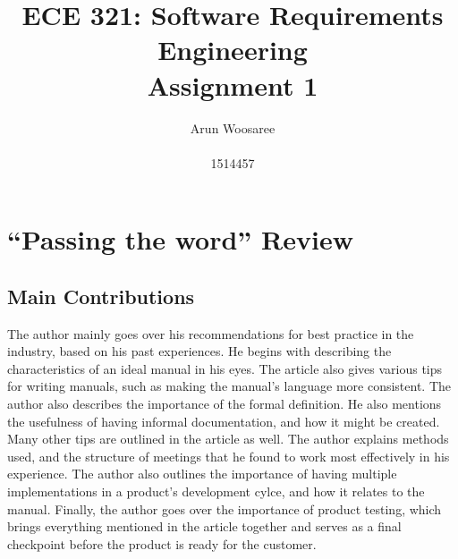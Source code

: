 \documentclass[letterpaper,12pt]{article}
\title{ECE 321: Software Requirements Engineering \\ Assignment 1}
\author{Arun Woosaree \\ \\ 1514457}
\begin{document}
\maketitle

\section{``Passing the word'' Review}

\subsection{Main Contributions}

The author mainly goes over his recommendations  for best practice in the
industry, based on his past experiences. He begins with describing the
characteristics of an ideal manual in his eyes. The article also gives various
tips for writing manuals, such as making the manual's language more consistent.
The author also describes the importance of the formal definition. He also
mentions the usefulness of having informal documentation, and how it might be
created. Many other tips are outlined in the article as well. The author
explains methods used, and the structure of meetings that he found to work most
effectively in his experience. The author also outlines the importance of having
multiple implementations in a product's development cylce, and how it relates to
the manual.  Finally, the author goes over the importance of product testing,
which brings everything mentioned in the article together and serves as a final
checkpoint before the product is ready for the customer.
\end{document}
